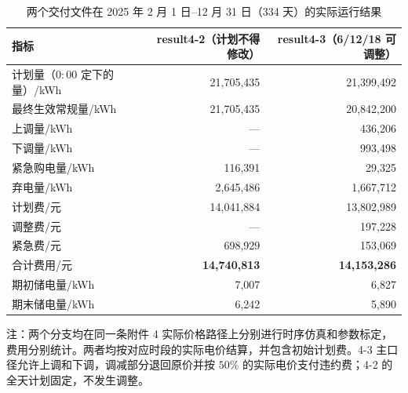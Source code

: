 
\begin{table}[htbp]
  \centering
  \caption{两个交付文件在 2025 年 2 月 1 日--12 月 31 日（334 天）的实际运行结果}
  \label{tab:p4-branch}
  \small
  \begin{tabular}{lrr}
    \toprule
    指标 & result4-2（计划不得修改） & result4-3（6/12/18 可调整） \\
    \midrule
    计划量（$0{:}00$ 定下的量）/kWh & 21,705,435 & 21,399,492 \\
    最终生效常规量/kWh & 21,705,435 & 20,842,200 \\
    上调量/kWh & --- & 436,206 \\
    下调量/kWh & --- & 993,498 \\
    紧急购电量/kWh & 116,391 & 29,325 \\
    \midrule
    弃电量/kWh & 2,645,486 & 1,667,712 \\
    计划费/元 & 14,041,884 & 13,802,989 \\
    调整费/元 & --- & 197,228 \\
    紧急费/元 & 698,929 & 153,069 \\
    合计费用/元 & \textbf{14,740,813} & \textbf{14,153,286} \\
    期初储电量/kWh & 7,007 & 6,827 \\
    期末储电量/kWh & 6,242 & 5,890 \\
    \bottomrule
  \end{tabular}
  \par\vspace{2pt}
  \begin{minipage}{\textwidth}\footnotesize
    注：两个分支均在同一条附件 4 实际价格路径上分别进行时序仿真和参数标定，费用分别统计。两者均按对应时段的实际电价结算，并包含初始计划费。4-3 主口径允许上调和下调，调减部分退回原价并按 $50\%$ 的实际电价支付违约费；4-2 的全天计划固定，不发生调整。
  \end{minipage}
\end{table}
